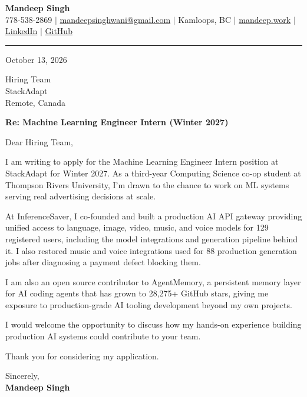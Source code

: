 \documentclass[letterpaper,11pt]{article}
\begin{document}
\begin{center}
    \textbf{\LARGE Mandeep Singh} \\ \vspace{2pt}
    \small 778-538-2869 $|$
    \href{mailto:mandeepsinghwani@gmail.com}{mandeepsinghwani@gmail.com} $|$
    Kamloops, BC $|$
    \href{https://mandeep.work}{mandeep.work} $|$
    \href{https://www.linkedin.com/in/mandeep-singh-b855972a7/}{LinkedIn} $|$
    \href{https://github.com/deepmroot}{GitHub}
\end{center}

\vspace{4pt}
\hrule
\vspace{14pt}

October 13, 2026

\vspace{8pt}
Hiring Team \\
StackAdapt \\
Remote, Canada

\vspace{8pt}
\textbf{Re: Machine Learning Engineer Intern (Winter 2027)}

\vspace{10pt}
Dear Hiring Team,

\vspace{4pt}
I am writing to apply for the Machine Learning Engineer Intern position at StackAdapt for Winter 2027. As a third-year Computing Science co-op student at Thompson Rivers University, I'm drawn to the chance to work on ML systems serving real advertising decisions at scale.

At InferenceSaver, I co-founded and built a production AI API gateway providing unified access to language, image, video, music, and voice models for 129 registered users, including the model integrations and generation pipeline behind it. I also restored music and voice integrations used for 88 production generation jobs after diagnosing a payment defect blocking them.

I am also an open source contributor to AgentMemory, a persistent memory layer for AI coding agents that has grown to 28,275+ GitHub stars, giving me exposure to production-grade AI tooling development beyond my own projects.

I would welcome the opportunity to discuss how my hands-on experience building production AI systems could contribute to your team.

Thank you for considering my application.

\vspace{16pt}
Sincerely, \\
\vspace{6pt}
\textbf{Mandeep Singh}
\end{document}
